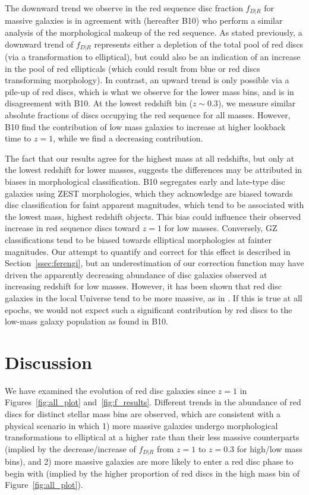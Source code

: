 \documentclass[useAMS,usenatbib]{mn2e}
\begin{document}
The downward trend we observe in the red sequence disc fraction $f_{D|R}$ for massive galaxies is in agreement with \citet{Bundy2010} (hereafter B10) who perform a similar analysis of the morphological makeup of the red sequence. As stated previously, a downward trend of $f_{D|R}$ represents either a depletion of the total pool of red discs (via a transformation to elliptical), but could also be an indication of an increase in the pool of red ellipticals (which could result from blue or red discs transforming morphology). In contrast, an upward trend is only possible via a pile-up of red discs, which is what we observe for the lower mass bins, and is in disagreement with B10. At the lowest redshift bin ($z\sim0.3$), we measure similar absolute fractions of discs occupying the red sequence for all masses. However, B10 find the contribution of low mass galaxies to increase at higher lookback time to $z=1$, while we find a decreasing contribution. 

The fact that our results agree for the highest mass at all redshifts, but only at the lowest redshift for lower masses, suggests the differences may be attributed in biases in morphological classification. B10 segregates early and late-type disc galaxies using ZEST \citep{Scarlata2007} morphologies, which they acknowledge are biased towards disc classification for faint apparent magnitudes, which tend to be associated with the lowest mass, highest redshift objects. This bias could influence their observed increase in red sequence discs toward $z=1$ for low masses. Conversely, GZ classifications tend to be biased towards elliptical morphologies at fainter magnitudes. Our attempt to quantify and correct for this effect is described in Section~\ref{ssec:ferengi}, but an underestimation of our correction function may have driven the apparently decreasing abundance of disc galaxies observed at increasing redshift for low masses. However, it has been shown that red disc galaxies in the local Universe tend to be more massive, as in \citet{Masters2011}. If this is true at all epochs, we would not expect such a significant contribution by red discs to the low-mass galaxy population as found in B10.

\section{Discussion}
\label{sec:discussion}
We have examined the evolution of red disc galaxies since $z=1$ in Figures~\ref{fig:all_plot} and~\ref{fig:f_results}. Different trends in the abundance of red discs for distinct stellar mass bins are observed, which are consistent with a physical scenario in which 1) more massive galaxies undergo morphological transformations to elliptical at a higher rate than their less massive counterparts (implied by the decrease/increase of $f_{D|R}$ from $z=1$ to $z=0.3$ for high/low mass bins), and 2) more massive galaxies are more likely to enter a red disc phase to begin with (implied by the higher proportion of red discs in the high mass bin of Figure~\ref{fig:all_plot}). 
\end{document}
